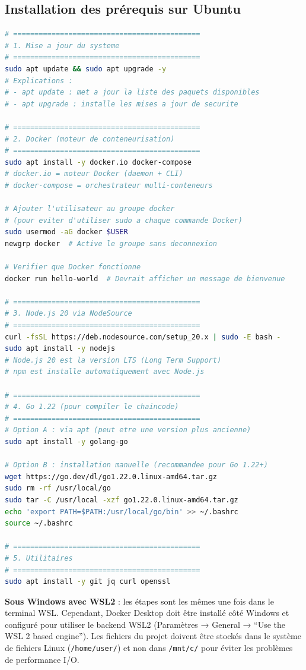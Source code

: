 \documentclass[12pt,a4paper,twoside]{report}
\begin{document}
\subsection{Installation des prérequis sur Ubuntu}

\begin{lstlisting}[language=bash, caption=Installation complète des prérequis]
# ============================================
# 1. Mise a jour du systeme
# ============================================
sudo apt update && sudo apt upgrade -y
# Explications :
# - apt update : met a jour la liste des paquets disponibles
# - apt upgrade : installe les mises a jour de securite

# ============================================
# 2. Docker (moteur de conteneurisation)
# ============================================
sudo apt install -y docker.io docker-compose
# docker.io = moteur Docker (daemon + CLI)
# docker-compose = orchestrateur multi-conteneurs

# Ajouter l'utilisateur au groupe docker
# (pour eviter d'utiliser sudo a chaque commande Docker)
sudo usermod -aG docker $USER
newgrp docker  # Active le groupe sans deconnexion

# Verifier que Docker fonctionne
docker run hello-world  # Devrait afficher un message de bienvenue

# ============================================
# 3. Node.js 20 via NodeSource
# ============================================
curl -fsSL https://deb.nodesource.com/setup_20.x | sudo -E bash -
sudo apt install -y nodejs
# Node.js 20 est la version LTS (Long Term Support)
# npm est installe automatiquement avec Node.js

# ============================================
# 4. Go 1.22 (pour compiler le chaincode)
# ============================================
# Option A : via apt (peut etre une version plus ancienne)
sudo apt install -y golang-go

# Option B : installation manuelle (recommandee pour Go 1.22+)
wget https://go.dev/dl/go1.22.0.linux-amd64.tar.gz
sudo rm -rf /usr/local/go
sudo tar -C /usr/local -xzf go1.22.0.linux-amd64.tar.gz
echo 'export PATH=$PATH:/usr/local/go/bin' >> ~/.bashrc
source ~/.bashrc

# ============================================
# 5. Utilitaires
# ============================================
sudo apt install -y git jq curl openssl
\end{lstlisting}

\begin{warningbox}
\textbf{Sous Windows avec WSL2} : les étapes sont les mêmes une fois dans le terminal WSL. Cependant, Docker Desktop doit être installé côté Windows et configuré pour utiliser le backend WSL2 (Paramètres → General → ``Use the WSL 2 based engine''). Les fichiers du projet doivent être stockés dans le système de fichiers Linux (\texttt{/home/user/}) et non dans \texttt{/mnt/c/} pour éviter les problèmes de performance I/O.
\end{warningbox}
\end{document}
